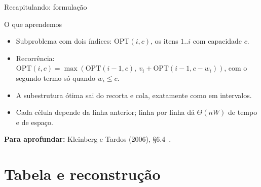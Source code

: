 \documentclass[aspectratio=169,xcolor=table]{beamer}
\newcommand{\fonte}[1]{%
  \vfill
  {\tiny\color{gray!55!black}\textbf{Para aprofundar:} #1\par}%
}
\begin{document}
\begin{frame}{Recapitulando: formulação}
  \begin{block}{O que aprendemos}
    \begin{itemize}\scriptsize
      \item Subproblema com dois índices: $\mathrm{OPT}(i,c)$, os itens $1..i$ com
            capacidade $c$.
      \item Recorrência: $\mathrm{OPT}(i,c) = \max(\mathrm{OPT}(i-1,c),\ v_i +
            \mathrm{OPT}(i-1,c-w_i))$, com o segundo termo só quando $w_i \le c$.
      \item A subestrutura ótima sai do recorta e cola, exatamente como em intervalos.
      \item Cada célula depende da linha anterior; linha por linha dá $\Theta(nW)$ de
            tempo e de espaço.
    \end{itemize}
  \end{block}
  \fonte{Kleinberg e Tardos (2006), \S 6.4~\cite{kleinberg2006algorithm}.}
\end{frame}

\section{Tabela e reconstrução}
\end{document}
